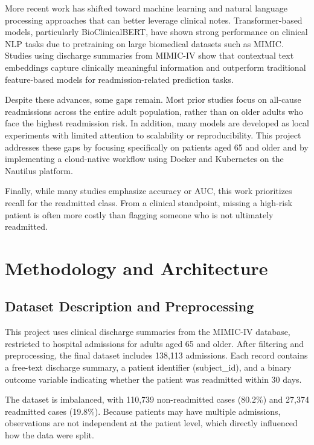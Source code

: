 \documentclass[11pt]{article}
\begin{document}
More recent work has shifted toward machine learning and natural language processing approaches that can better leverage clinical notes. Transformer-based models, particularly BioClinicalBERT, have shown strong performance on clinical NLP tasks due to pretraining on large biomedical datasets such as MIMIC. Studies using discharge summaries from MIMIC-IV show that contextual text embeddings capture clinically meaningful information and outperform traditional feature-based models for readmission-related prediction tasks.

Despite these advances, some gaps remain. Most prior studies focus on all-cause readmissions across the entire adult population, rather than on older adults who face the highest readmission risk. In addition, many models are developed as local experiments with limited attention to scalability or reproducibility. This project addresses these gaps by focusing specifically on patients aged 65 and older and by implementing a cloud-native workflow using Docker and Kubernetes on the Nautilus platform.

Finally, while many studies emphasize accuracy or AUC, this work prioritizes recall for the readmitted class. From a clinical standpoint, missing a high-risk patient is often more costly than flagging someone who is not ultimately readmitted.

\section{Methodology and Architecture}

\subsection{Dataset Description and Preprocessing}

This project uses clinical discharge summaries from the MIMIC-IV database, restricted to hospital admissions for adults aged 65 and older. After filtering and preprocessing, the final dataset includes 138,113 admissions. Each record contains a free-text discharge summary, a patient identifier (subject\_id), and a binary outcome variable indicating whether the patient was readmitted within 30 days.

The dataset is imbalanced, with 110,739 non-readmitted cases (80.2\%) and 27,374 readmitted cases (19.8\%). Because patients may have multiple admissions, observations are not independent at the patient level, which directly influenced how the data were split.
\end{document}
